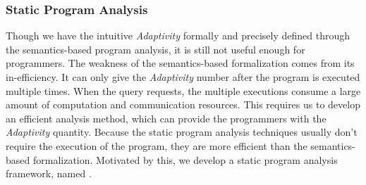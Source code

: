 \subsubsection{Static Program Analysis}
\label{sec:adapt-intro-static}
%
Though we have the intuitive \emph{Adaptivity} formally and precisely defined through the semantics-based program analysis,
it is still not useful enough for programmers.
The weakness of the semantics-based formalization comes from its in-efficiency.
It can only give the \emph{Adaptivity} number
after the program is executed multiple times.
When the query requests, the multiple executions consume a large amount of computation and communication resources.
This requires us to develop an efficient analysis method, 
which can provide the programmers with the \emph{Adaptivity} quantity.
Because the static program analysis techniques usually don't require the execution of the program,
they are more efficient than the semantics-based formalization.
Motivated by this, we develop a static program analysis framework, named {\THESYSTEM}.
